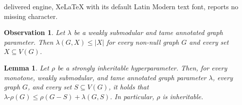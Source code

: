 \documentclass[10pt,a4paper]{amsart}
\newtheorem{lemma}[theorem]{Lemma}
\newtheorem{observation}[theorem]{Observation}
\begin{document}
delivered engine, XeLaTeX with its default Latin Modern text font, reports no missing character.
\begin{observation}\label{at-most-card}
Let $\lambda$ be a weakly submodular and tame annotated graph parameter.
Then \hbox{$\lambda(G,X)\le |X|$} for every non-null graph $G$ and every set $X\subseteq V(G)$.
\end{observation}

\begin{lemma}\label{inheritable-lambda-rho at most}
Let $\rho$ be a strongly inheritable hyperparameter.
Then, for every monotone, weakly submodular, and tame annotated graph parameter $\lambda$, every graph $G$, and every set $S\subseteq V(G)$, it holds that $\lambda\text{-}\rho(G)\le \rho(G-S) + \lambda(G,S)$.
In particular, $\rho$ is inheritable.
\end{lemma}
\end{document}
